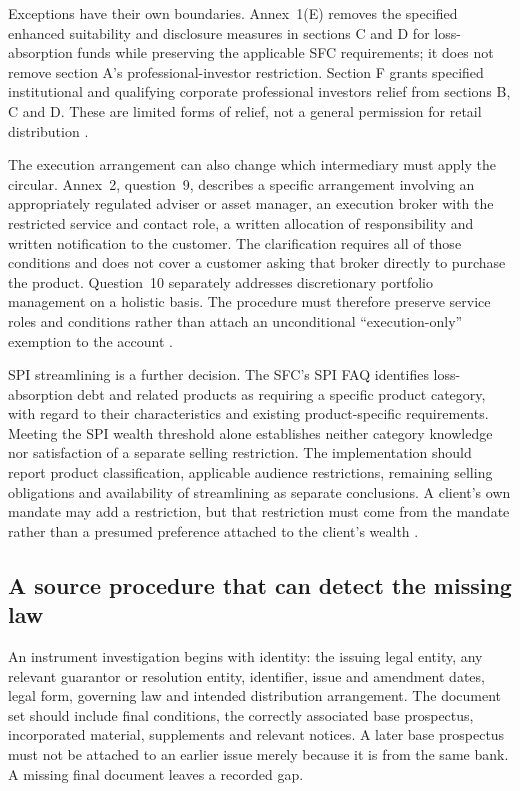 \documentclass[12pt,a4paper,oneside,openany]{book}
\begin{document}
Exceptions have their own boundaries. Annex~1(E) removes the specified enhanced
suitability and disclosure measures in sections C and D for loss-absorption
funds while preserving the applicable SFC requirements; it does not remove
section A's professional-investor restriction. Section F grants specified
institutional and qualifying corporate professional investors relief from
sections B, C and D. These are limited forms of relief, not a general
permission for retail distribution
\citep[sections~E--F]{hkmalacannex2022}.

The execution arrangement can also change which intermediary must apply the
circular. Annex~2, question~9, describes a specific arrangement involving an
appropriately regulated adviser or asset manager, an execution broker with
the restricted service and contact role, a written allocation of responsibility
and written notification to the customer. The clarification requires all of
those conditions and does not cover a customer asking that broker directly to
purchase the product. Question~10 separately addresses discretionary portfolio
management on a holistic basis. The procedure must therefore preserve service
roles and conditions rather than attach an unconditional ``execution-only''
exemption to the account \citep[questions~9--10]{hkmalacfaq2022}.

SPI streamlining is a further decision. The SFC's SPI FAQ identifies
loss-absorption debt and related products as requiring a specific product
category, with regard to their characteristics and existing product-specific
requirements. Meeting the SPI wealth threshold alone establishes neither
category knowledge nor satisfaction of a separate selling restriction.
The implementation should report product classification, applicable audience
restrictions, remaining selling obligations and availability of streamlining
as separate conclusions. A client's own mandate may add a restriction, but
that restriction must come from the mandate rather than a presumed preference
attached to the client's wealth
\citep[questions~3--4]{sfcspiprospectusfaq}.

\subsection{A source procedure that can detect the missing law}

An instrument investigation begins with identity: the issuing legal entity,
any relevant guarantor or resolution entity, identifier, issue and amendment
dates, legal form, governing law and intended distribution arrangement. The
document set should include final conditions, the correctly associated base
prospectus, incorporated material, supplements and relevant notices. A later
base prospectus must not be attached to an earlier issue merely because it is
from the same bank. A missing final document leaves a recorded gap.
\end{document}
